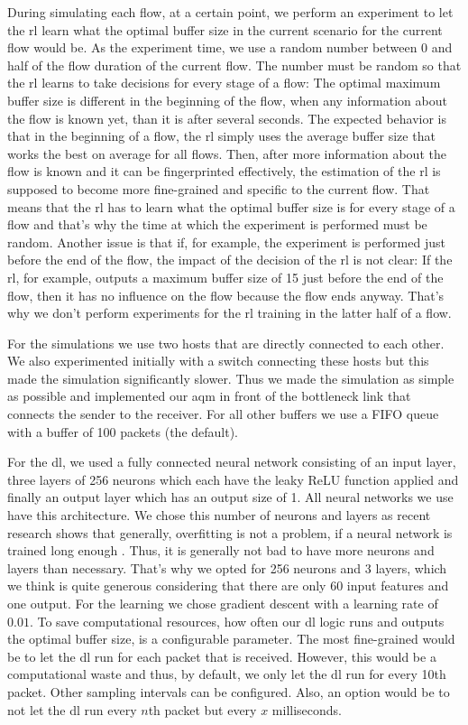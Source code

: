 \documentclass[conference]{IEEEtran}
\begin{document}
During simulating each flow, at a certain point, we perform an experiment to let the \gls{rl} learn what the optimal buffer size in the current scenario for the current flow would be. As the experiment time, we use a random number between 0 and half of the flow duration of the current flow. The number must be random so that the \gls{rl} learns to take decisions for every stage of a flow: The optimal maximum buffer size is different in the beginning of the flow, when any information about the flow is known yet, than it is after several seconds. The expected behavior is that in the beginning of a flow, the \gls{rl} simply uses the average buffer size that works the best on average for all flows. Then, after more information about the flow is known and it can be fingerprinted effectively, the estimation of the \gls{rl} is supposed to become more fine-grained and specific to the current flow. That means that the \gls{rl} has to learn what the optimal buffer size is for every stage of a flow and that's why the time at which the experiment is performed must be random. Another issue is that if, for example, the experiment is performed just before the end of the flow, the impact of the decision of the \gls{rl} is not clear: If the \gls{rl}, for example, outputs a maximum buffer size of 15 just before the end of the flow, then it has no influence on the flow because the flow ends anyway. That's why we don't perform experiments for the \gls{rl} training in the latter half of a flow.  

For the simulations we use two hosts that are directly connected to each other. We also experimented initially with a switch connecting these hosts but this made the simulation significantly slower. Thus we made the simulation as simple as possible and implemented our \gls{aqm} in front of the bottleneck link that connects the sender to the receiver. For all other buffers we use a FIFO queue with a buffer of 100 packets (the default). 

For the \gls{dl}, we used a fully connected neural network consisting of an input layer, three layers of 256 neurons which each have the leaky ReLU \cite{noauthor_rectifier_2020} function applied and finally an output layer which has an output size of 1. All neural networks we use have this architecture. We chose this number of neurons and layers as recent research shows that generally, overfitting is not a problem, if a neural network is trained long enough \cite{nakkiran_deep_2019}. Thus, it is generally not bad to have more neurons and layers than necessary. That's why we opted for 256 neurons and 3 layers, which we think is quite generous considering that there are only 60 input features and one output. For the learning we chose gradient descent with a learning rate of $0.01$. To save computational resources, how often our \gls{dl} logic runs and outputs the optimal buffer size, is a configurable parameter. The most fine-grained would be to let the \gls{dl} run for each packet that is received. However, this would be a computational waste and thus, by default, we only let the \gls{dl} run for every 10th packet. Other sampling intervals can be configured. Also, an option would be to not let the \gls{dl} run every $n$th packet but every $x$ milliseconds. 
\end{document}
